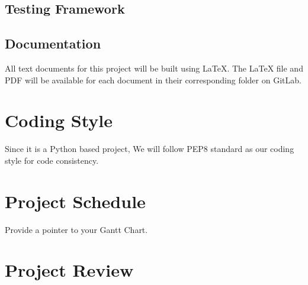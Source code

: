 \documentclass{article}
\begin{document}
\subsection{Testing Framework}

\subsection{Documentation}
All text documents for this project will be built using LaTeX. The LaTeX file and PDF will be available for each document in their corresponding folder on GitLab. 


\section{Coding Style}
Since it is a Python based project, We will follow PEP8 standard as our coding style for code consistency.

\section{Project Schedule}

Provide a pointer to your Gantt Chart.

\section{Project Review}
\end{document}
